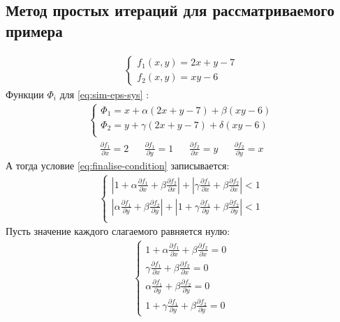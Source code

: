 \subsection{Метод простых итераций для рассматриваемого примера}
\begin{align}
	\begin{cases}
		f_1(x, y) = 2x + y - 7 \\
		f_2(x, y) = xy - 6
	\end{cases}
\end{align}
Функции \(\Phi_i\) для \cref{eq:sim-eps-sys} :
\begin{align}
	\begin{cases}
		\Phi_1 = x + \alpha (2 x + y - 7) + \beta (xy - 6)  \\
		\Phi_2 = y + \gamma (2 x + y - 7) + \delta (xy - 6) \\
	\end{cases}
\end{align}
\begin{align}\label{eq:partials}
	\frac{\partial f_1}{\partial x} = 2 &  &
	\frac{\partial f_1}{\partial y} = 1 &  &
	\frac{\partial f_2}{\partial x} = y &  &
	\frac{\partial f_2}{\partial y} = x
\end{align}
А тогда условие \cref{eq:finalise-condition} записывается:
\begin{align}
	\begin{cases}
		|1 + \alpha \frac{\partial f_1}{\partial x} + \beta \frac{\partial f_2}{\partial x}| + |\gamma \frac{\partial f_1}{\partial x} + \beta \frac{\partial f_2}{\partial x}| < 1 \\
		|\alpha \frac{\partial f_1}{\partial y} + \beta \frac{\partial f_2}{\partial y}| + |1 + \gamma \frac{\partial f_1}{\partial y} + \beta \frac{\partial f_2}{\partial y}| < 1 \\
	\end{cases}
\end{align}
Пусть значение каждого слагаемого равняется нулю:
\begin{align}\label{eq:pre-subst}
	\begin{cases}
		1 + \alpha \frac{\partial f_1}{\partial x} + \beta \frac{\partial f_2}{\partial x} = 0 \\
		\gamma \frac{\partial f_1}{\partial x} + \beta \frac{\partial f_2}{\partial x} = 0     \\
		\alpha \frac{\partial f_1}{\partial y} + \beta \frac{\partial f_2}{\partial y} = 0     \\
		1 + \gamma \frac{\partial f_1}{\partial y} + \beta \frac{\partial f_2}{\partial y} = 0
	\end{cases}
\end{align}

